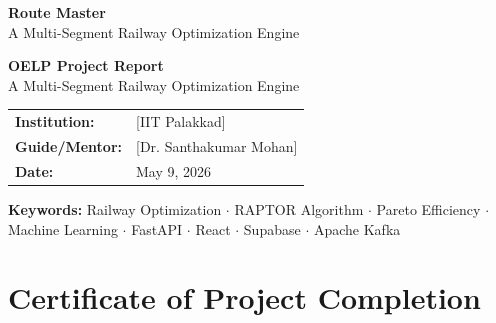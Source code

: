 \documentclass[12pt,a4paper]{report}
\begin{document}

\begin{titlepage}
  \centering
  \vspace*{1cm}
  {\Huge\bfseries\color{primary} Route Master}\\[0.4cm]
  {\Large\color{darkgray} A Multi-Segment Railway Optimization Engine}\\[1.5cm]
  
  \begin{tcolorbox}[colback=lightgray,colframe=primary,width=0.85\textwidth,arc=5pt]
    \centering
    {\large\textbf{OELP Project Report}}\\[0.3cm]
    {\normalsize A Multi-Segment Railway Optimization Engine}
  \end{tcolorbox}
  
  \vspace{1.5cm}
  
 
  
  \vspace{1.5cm}
  
  \begin{tabular}{ll}
    \textbf{Institution:} & [IIT Palakkad] \\[4pt]
    \textbf{Guide/Mentor:} & [Dr. Santhakumar Mohan] \\[4pt]
    \textbf{Date:} & May 9, 2026 \\
  \end{tabular}
  
  \vfill
  
  \begin{tcolorbox}[colback=primary!90!black,coltext=white,arc=5pt,width=0.85\textwidth]
    \centering
    \textbf{Keywords:} Railway Optimization $\cdot$ RAPTOR Algorithm $\cdot$ Pareto Efficiency $\cdot$
    Machine Learning $\cdot$ FastAPI $\cdot$ React $\cdot$ Supabase $\cdot$ Apache Kafka
  \end{tcolorbox}
\end{titlepage}

\chapter*{Certificate of Project Completion}
\end{document}
